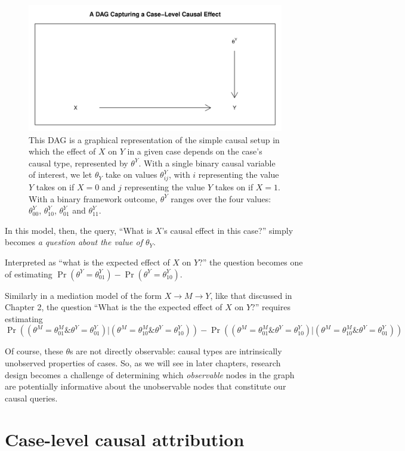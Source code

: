 \documentclass[
  12pt,
]{book}
\begin{document}
\begin{figure}

{\centering \includegraphics[width=.5\textwidth]{ii_files/figure-latex/casequery-1} 

}

\caption{\label{fig:casequery} This DAG is a graphical representation of the simple causal setup in which the effect of $X$ on $Y$ in a given case depends on the case's causal type, represented by $\theta^Y$. With a single binary causal variable of interest, we let $\theta_Y$ take on values $\theta^Y_{ij}$, with $i$ representing the value $Y$ takes on if $X=0$ and $j$ representing the value $Y$ takes on if $X=1$. With a binary framework outcome, $\theta^Y$ ranges over the four values: $\theta^Y_{00}$, $\theta^Y_{10}$, $\theta^Y_{01}$ and $\theta^Y_{11}$.}\label{fig:casequery}
\end{figure}

In this model, then, the query, ``What is \(X\)'s causal effect in this case?'' simply becomes \emph{a question about the value of \(\theta_Y\)}.

Interpreted as ``what is the expected effect of \(X\) on \(Y\)?'' the question becomes one of estimating \(\Pr(\theta^Y = \theta^Y_{01}) - \Pr(\theta^Y = \theta^Y_{10})\).

Similarly in a mediation model of the form \(X\rightarrow M \rightarrow Y\), like that discussed in Chapter 2, the question ``What is the the expected effect of \(X\) on \(Y\)?'' requires estimating
\[\Pr((\theta^M = \theta^M_{01} \& \theta^Y = \theta^Y_{01}) | (\theta^M = \theta^M_{10} \& \theta^Y = \theta^Y_{10}))   - \Pr((\theta^M = \theta^M_{01} \& \theta^Y = \theta^Y_{10}) | (\theta^M = \theta^M_{10} \& \theta^Y = \theta^Y_{01}))\]

Of course, these \(\theta\)s are not directly observable: causal types are intrinsically unobserved properties of cases. So, as we will see in later chapters, research design becomes a challenge of determining which \emph{observable} nodes in the graph are potentially informative about the unobservable nodes that constitute our causal queries.

\hypertarget{case-level-causal-attribution}{%
\section{Case-level causal attribution}\label{case-level-causal-attribution}}
\end{document}
